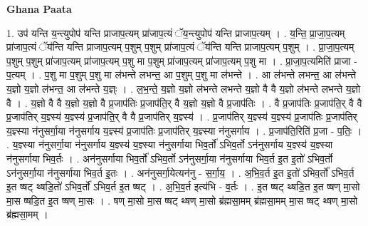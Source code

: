 \documentclass[17pt]{extarticle}
\begin{document}
\textbf{Ghana Paata } \newline

1. उप॑ यन्ति य॒न्त्युपोप॑ यन्ति प्राजाप॒त्यम् प्रा॑जाप॒त्यं ॅय॒न्त्युपोप॑ यन्ति प्राजाप॒त्यम् । . य॒न्ति॒ प्रा॒जा॒प॒त्यम् प्रा॑जाप॒त्यं ॅय॑न्ति यन्ति प्राजाप॒त्यम् प॒शुम् प॒शुम् प्रा॑जाप॒त्यं ॅय॑न्ति यन्ति प्राजाप॒त्यम् प॒शुम् । . प्रा॒जा॒प॒त्यम् प॒शुम् प॒शुम् प्रा॑जाप॒त्यम् प्रा॑जाप॒त्यम् प॒शु मा प॒शुम् प्रा॑जाप॒त्यम् प्रा॑जाप॒त्यम् प॒शु मा । . प्रा॒जा॒प॒त्यमिति॑ प्राजा - प॒त्यम् । . प॒शु मा प॒शुम् प॒शु मा ल॑भन्ते लभन्त॒ आ प॒शुम् प॒शु मा ल॑भन्ते । . आ ल॑भन्ते लभन्त॒ आ ल॑भन्ते य॒ज्ञो य॒ज्ञो ल॑भन्त॒ आ ल॑भन्ते य॒ज्ञ्ः । . ल॒भ॒न्ते॒ य॒ज्ञो य॒ज्ञो ल॑भन्ते लभन्ते य॒ज्ञो वै वै य॒ज्ञो ल॑भन्ते लभन्ते य॒ज्ञो वै । . य॒ज्ञो वै वै य॒ज्ञो य॒ज्ञो वै प्र॒जाप॑तिः प्र॒जाप॑ति॒र् वै य॒ज्ञो य॒ज्ञो वै प्र॒जाप॑तिः । . वै प्र॒जाप॑तिः प्र॒जाप॑ति॒र् वै वै प्र॒जाप॑तिर् य॒ज्ञ्स्य॑ य॒ज्ञ्स्य॑ प्र॒जाप॑ति॒र् वै वै प्र॒जाप॑तिर् य॒ज्ञ्स्य॑ । . प्र॒जाप॑तिर् य॒ज्ञ्स्य॑ य॒ज्ञ्स्य॑ प्र॒जाप॑तिः प्र॒जाप॑तिर् य॒ज्ञ्स्या न॑नुसर्गा॒या न॑नुसर्गाय य॒ज्ञ्स्य॑ प्र॒जाप॑तिः प्र॒जाप॑तिर् य॒ज्ञ्स्या न॑नुसर्गाय । . प्र॒जाप॑ति॒रिति॑ प्र॒जा - प॒तिः॒ । . य॒ज्ञ्स्या न॑नुसर्गा॒या न॑नुसर्गाय य॒ज्ञ्स्य॑ य॒ज्ञ्स्या न॑नुसर्गाया भिव॒र्तो॑ ऽभिव॒र्तो ऽन॑नुसर्गाय य॒ज्ञ्स्य॑ य॒ज्ञ्स्या न॑नुसर्गाया भिव॒र्तः । . अन॑नुसर्गाया भिव॒र्तो॑ ऽभिव॒र्तो ऽन॑नुसर्गा॒या न॑नुसर्गाया भिव॒र्त इ॒त इ॒तो॑ ऽभिव॒र्तो ऽन॑नुसर्गा॒या न॑नुसर्गाया भिव॒र्त इ॒तः । . अन॑नुसर्गा॒येत्यन॑नु - स॒र्गा॒य॒ । . अ॒भि॒व॒र्त इ॒त इ॒तो॑ ऽभिव॒र्तो॑ ऽभिव॒र्त इ॒त ष्षट् थ्षडि॒तो॑ ऽभिव॒र्तो॑ ऽभिव॒र्त इ॒त ष्षट् । . अ॒भि॒व॒र्त इत्य॑भि - व॒र्तः । . इ॒त ष्षट् थ्षडि॒त इ॒त ष्षण् मा॒सो मा॒स ष्षडि॒त इ॒त ष्षण् मा॒सः । . षण् मा॒सो मा॒स ष्षट् थ्षण् मा॒सो ब्र॑ह्मसा॒मम् ब्र॑ह्मसा॒मम् मा॒स ष्षट् थ्षण् मा॒सो ब्र॑ह्मसा॒मम् । \newline
\end{document}
